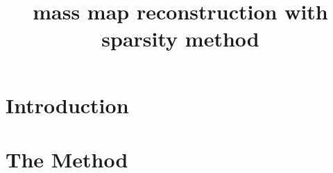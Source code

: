\documentclass[twocolumn]{aastex62}
\begin{document}
\title{mass map reconstruction with sparsity method}




\begin{abstract}

\end{abstract}

\section{Introduction}


\section{The Method}
\label{sec:kappaMap}
\end{document}
